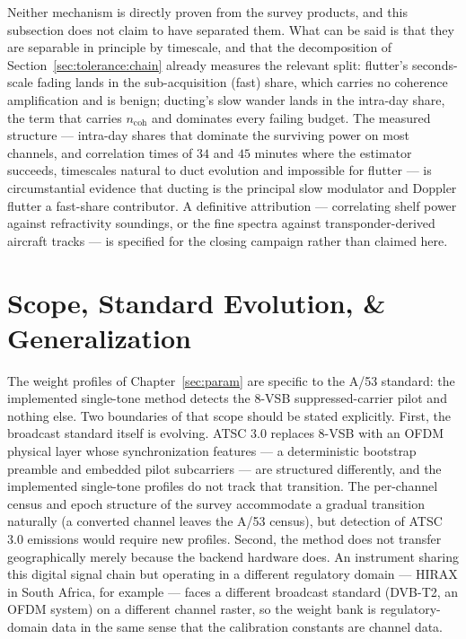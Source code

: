 Neither mechanism is directly proven from the survey products, and this subsection does not claim to have separated them. What can be said is that they are separable in principle by timescale, and that the decomposition of Section~\ref{sec:tolerance:chain} already measures the relevant split: flutter's seconds-scale fading lands in the sub-acquisition (fast) share, which carries no coherence amplification and is benign; ducting's slow wander lands in the intra-day share, the term that carries $n_{\text{coh}}$ and dominates every failing budget. The measured structure --- intra-day shares that dominate the surviving power on most channels, and correlation times of $34$ and $45$ minutes where the estimator succeeds, timescales natural to duct evolution and impossible for flutter --- is circumstantial evidence that ducting is the principal slow modulator and Doppler flutter a fast-share contributor. A definitive attribution --- correlating shelf power against refractivity soundings, or the fine spectra against transponder-derived aircraft tracks --- is specified for the closing campaign rather than claimed here.

\section{Scope, Standard Evolution, \& Generalization}
\label{sec:dtv:scope}
The weight profiles of Chapter~\ref{sec:param} are specific to the A/53 standard: the implemented single-tone method detects the 8-VSB suppressed-carrier pilot and nothing else. Two boundaries of that scope should be stated explicitly. First, the broadcast standard itself is evolving. ATSC 3.0 replaces 8-VSB with an OFDM physical layer whose synchronization features --- a deterministic bootstrap preamble and embedded pilot subcarriers --- are structured differently, and the implemented single-tone profiles do not track that transition. The per-channel census and epoch structure of the survey accommodate a gradual transition naturally (a converted channel leaves the A/53 census), but detection of ATSC 3.0 emissions would require new profiles. Second, the method does not transfer geographically merely because the backend hardware does. An instrument sharing this digital signal chain but operating in a different regulatory domain --- HIRAX in South Africa, for example --- faces a different broadcast standard (DVB-T2, an OFDM system) on a different channel raster, so the weight bank is regulatory-domain data in the same sense that the calibration constants are channel data.


